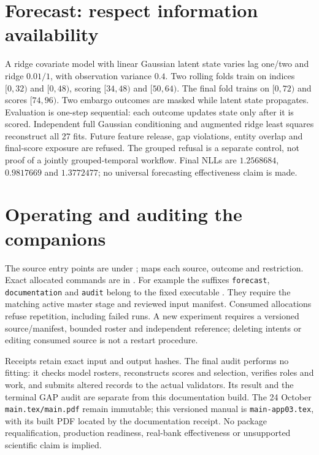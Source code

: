 \section{Forecast: respect information availability}
A ridge covariate model with linear Gaussian latent state varies lag one/two
and ridge $0.01/1$, with observation variance $0.4$. Two rolling folds train
on indices $[0,32)$ and $[0,48)$, scoring $[34,48)$ and $[50,64)$.
The final fold trains on $[0,72)$ and scores $[74,96)$.
Two embargo outcomes are masked while latent state propagates. Evaluation
is one-step sequential: each outcome updates state only after it is scored.
Independent full Gaussian conditioning and augmented ridge least squares
reconstruct all 27 fits. Future feature release, gap violations, entity overlap
and final-score exposure are refused. The grouped refusal is a separate
control, not proof of a jointly grouped-temporal workflow.
Final NLLs are $1.2568684$, $0.9817669$ and $1.3772477$; no universal
forecasting effectiveness claim is made.

\section{Operating and auditing the companions}
The source entry points are under ;
 maps each source, outcome and restriction.
Exact allocated commands are in .
For example the suffixes \texttt{forecast}, \texttt{documentation} and
\texttt{audit} belong to the fixed executable
.
They require the matching active master stage and reviewed input manifest.
Consumed allocations refuse repetition, including failed runs. A new experiment
requires a versioned source/manifest, bounded roster and independent reference;
deleting intents or editing consumed source is not a restart procedure.

Receipts retain exact input and output hashes. The final audit performs no
fitting: it checks model rosters, reconstructs scores and selection, verifies
roles and work, and submits altered records to the actual validators.
Its result and the terminal GAP audit are separate from this documentation
build. The 24 October \texttt{main.tex/main.pdf} remain immutable; this
versioned manual is \texttt{main-app03.tex}, with its built PDF located by
the documentation receipt. No package requalification, production readiness,
real-bank effectiveness or unsupported scientific claim is implied.
